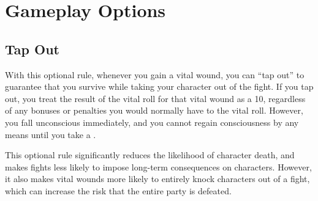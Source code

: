 \section{Gameplay Options}
    \subsection{Tap Out}
        With this optional rule, whenever you gain a vital wound, you can ``tap out'' to guarantee that you survive while taking your character out of the fight.
        If you tap out, you treat the result of the vital roll for that vital wound as a 10, regardless of any bonuses or penalties you would normally have to the vital roll.
        However, you fall unconscious immediately, and you cannot regain consciousness by any means until you take a .

        This optional rule significantly reduces the likelihood of character death, and makes fights less likely to impose long-term consequences on characters.
        However, it also makes vital wounds more likely to entirely knock characters out of a fight, which can increase the risk that the entire party is defeated.

